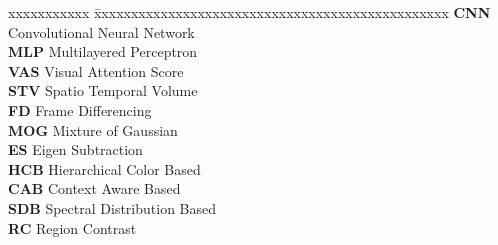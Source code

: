 \abbreviations
\noindent 
\begin{tabbing}
xxxxxxxxxxx \= xxxxxxxxxxxxxxxxxxxxxxxxxxxxxxxxxxxxxxxxxxxxxxxx \kill
\textbf{CNN}   \> Convolutional Neural Network \\
\textbf{MLP}   \> Multilayered Perceptron \\
\textbf{VAS}   \> Visual Attention Score \\
\textbf{STV} \> Spatio Temporal Volume \\
\textbf{FD} \> Frame Differencing \\
\textbf{MOG} \> Mixture of Gaussian \\
\textbf{ES} \> Eigen Subtraction \\
\textbf{HCB} \> Hierarchical Color Based \\
\textbf{CAB} \> Context Aware Based \\
\textbf{SDB} \> Spectral Distribution Based \\
\textbf{RC} \> Region Contrast \\
\end{tabbing}
